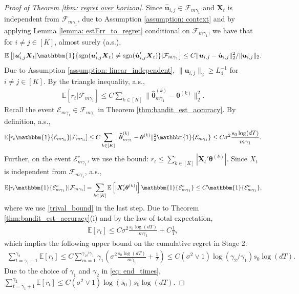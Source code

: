 \documentclass[aos,preprint]{imsart}
\theoremstyle{plain}
\theoremstyle{definition}
\newcommand{\btheta}{\boldsymbol{\theta}}
\newcommand{\hbtheta}{\widehat{\boldsymbol{\theta}}}
\newcommand{\idf}{\mathbbm{1}}
\newcommand{\bX}{\boldsymbol{X}}
\newcommand{\bu}{\boldsymbol{u}}
\newcommand{\hbu}{\hat{\boldsymbol{u}}}
\newcommand{\cF}{\mathcal{F}}
\newcommand{\Exp}{\mathbb{E}}
\begin{document}
\begin{proof}[Proof of Theorem \ref{thm: regret over horizon}]
Since $\hat{\bu}_{i,j} \in \cF_{m\gamma_1}$  and $\bX_t$ is independent from $\cF_{m\gamma_1}$, due to Assumption \ref{assumption: context} and by applying Lemma \ref{lemma: estErr_to_regret}  conditional on $\cF_{m\gamma_1}$, we have that for $i\neq j \in [K]$, almost surely (a.s.),
\begin{align*}
    \Exp\left[|\bu_{i,j}'\bX_t| \idf\{\textup{sgn}(\bu_{i,j}'\bX_t)\neq \textup{sgn}(\hbu_{i,j}'\bX_t)\}\vert \cF_{m\gamma_1}\right] \leq C  {\|\bu_{i,j} -\hbu_{i,j}\|_2^{2}}/{\|\bu_{i,j}\|_2}.
\end{align*}
Due to Assumption \ref{assumption: linear_independent}, $\|\bu_{i,j}\|_2 \geq L_4^{-1}$ for $i \neq j \in [K]$. By the triangle inequality, a.s.,
\begin{align*}
\Exp\left[r_t \vert \cF_{m\gamma_1}\right]
\leq C \sum_{k \in [K]} \|\hbtheta^{(k)}_{m\gamma_1} - \btheta^{(k)}\|_2^2.
\end{align*}
Recall the event $\mathcal{E}_{m\gamma_1} \in \cF_{m\gamma_1}$ in Theorem \ref{thm:bandit_est_accuracy}. By definition, a.s.,
\begin{align*}
  \Exp[r_t \idf\{\mathcal{E}_{m\gamma_1}\} \vert \cF_{m\gamma_1}] \leq  C \sum_{k \in [K]} \|\hbtheta^{(k)}_{m\gamma_1} - \btheta^{(k)}\|_2^2 \idf\{\mathcal{E}_{m\gamma_1}\} \leq C \sigma^2 \frac{s_0\log(dT)}{m\gamma_1}.
\end{align*}
Further, on the event $\mathcal{E}_{m\gamma_1}^c$, we use the bound: $r_t \leq \sum_{k \in [K]} |\bX_t'\btheta^{(k)}|$. Since $X_t$ is independent from $\cF_{m\gamma_1}$, a.s.,
\begin{align*}
 \Exp[r_t \idf\{\mathcal{E}_{m\gamma_1}^c\} \vert \cF_{m\gamma_1}] =   \sum_{k \in [K]}\Exp\left[  |\bX_t'\btheta^{(k)}|\right] \idf\{\mathcal{E}_{m\gamma_1}^c\} \leq C \idf\{\mathcal{E}_{m\gamma_1}^c\},
\end{align*}
where we use \eqref{trival_bound} in the last step. 
Due to Theorem \ref{thm:bandit_est_accuracy}(i) and by the law of total expectation,
\begin{align*}%
    \Exp\left[r_t\right] 
    \leq  C \sigma^2 \frac{s_0\log(dT)}{m\gamma_1} + C \frac{1}{T},
\end{align*}
which implies the following upper bound on the cumulative regret in Stage 2:
\begin{align*}
  \sum_{t = \gamma_1 + 1}^{\gamma_2} \Exp[r_t]  
  \leq C \sum_{m=1}^{\gamma_2/\gamma_1} \gamma_1\left(\sigma^2 \frac{s_0\log(dT)}{m\gamma_1} +  \frac{1}{T}\right)
  \leq C (\sigma^2 \vee 1)\log(\gamma_2/\gamma_1) s_0\log(dT).
\end{align*}
Due to the choice of $\gamma_1$ and $\gamma_2$ in \eqref{eq: end_times}, $\sum_{t = \gamma_1 + 1}^{\gamma_2} \Exp[r_t] \leq C (\sigma^2 \vee 1) \log(s_0) s_0\log(dT)$.


\end{proof}
\end{document}
